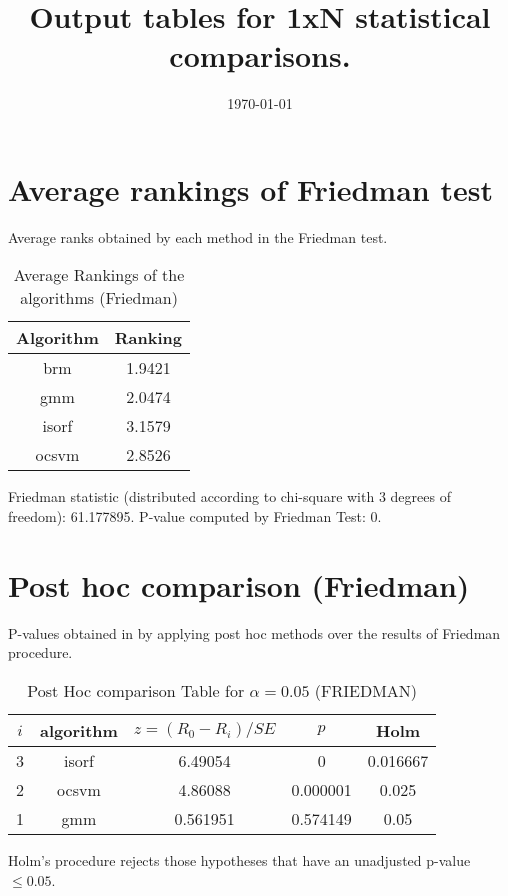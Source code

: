 \documentclass[a4paper,10pt]{article}
\title{Output tables for 1xN statistical comparisons.}
\author{}
\date{\today}
\begin{document}
\begin{landscape}
\pagestyle{empty}
\maketitle
\thispagestyle{empty}

\section{Average rankings of Friedman test}


Average ranks obtained by each method in the Friedman test.

\begin{table}[!htp]
\centering
\begin{tabular}{|c|c|}\hline
Algorithm&Ranking\\\hline
brm&1.9421\\gmm&2.0474\\isorf&3.1579\\ocsvm&2.8526\\\hline\end{tabular}
\caption{Average Rankings of the algorithms (Friedman)}
\end{table}

Friedman statistic (distributed according to chi-square with 3 degrees of freedom): 61.177895. \newline P-value computed by Friedman Test: 0.\newline


\newpage

\section{Post hoc comparison (Friedman)}


P-values obtained in by applying post hoc methods over the results of Friedman procedure.

\begin{table}[!htp]
\centering\footnotesize
\begin{tabular}{ccccc}
$i$&algorithm&$z=(R_0 - R_i)/SE$&$p$&Holm \\
\hline3&isorf&6.49054&0&0.016667\\2&ocsvm&4.86088&0.000001&0.025\\1&gmm&0.561951&0.574149&0.05\\\hline
\end{tabular}
\caption{Post Hoc comparison Table for $\alpha=0.05$ (FRIEDMAN)}
\end{table}Holm's procedure rejects those hypotheses that have an unadjusted p-value $\le0.05$.



\end{landscape}
\end{document}
